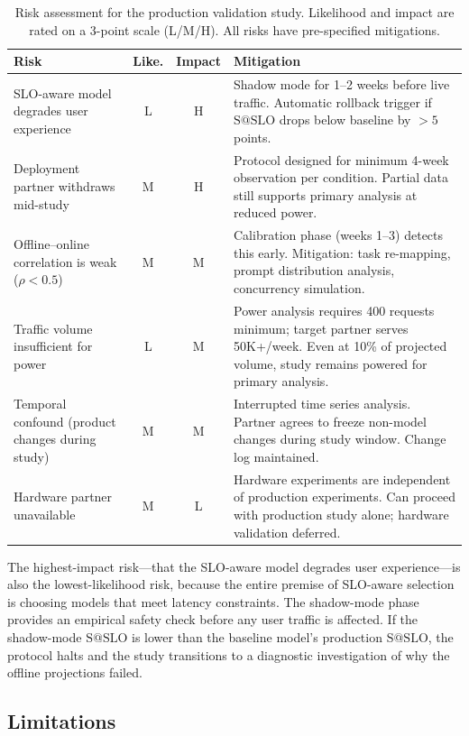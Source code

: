 \documentclass[11pt]{article}
\makeatletter
\newcommand{\sslo}{\ensuremath{\mathrm{S@SLO}}}
\makeatother
\begin{document}
\begin{table}[t]
\centering
\caption{Risk assessment for the production validation study. Likelihood and impact are rated on a 3-point scale (L/M/H). All risks have pre-specified mitigations.}
\label{tab:risks}
\small
\begin{tabular}{p{3.2cm} c c p{5.8cm}}
\toprule
\textbf{Risk} & \textbf{Like.} & \textbf{Impact} & \textbf{Mitigation} \\
\midrule
SLO-aware model degrades user experience & L & H & Shadow mode for 1--2 weeks before live traffic. Automatic rollback trigger if $\sslo{}$ drops below baseline by $>5$ points. \\[4pt]
Deployment partner withdraws mid-study & M & H & Protocol designed for minimum 4-week observation per condition. Partial data still supports primary analysis at reduced power. \\[4pt]
Offline--online correlation is weak ($\rho < 0.5$) & M & M & Calibration phase (weeks 1--3) detects this early. Mitigation: task re-mapping, prompt distribution analysis, concurrency simulation. \\[4pt]
Traffic volume insufficient for power & L & M & Power analysis requires 400 requests minimum; target partner serves 50K+/week. Even at 10\% of projected volume, study remains powered for primary analysis. \\[4pt]
Temporal confound (product changes during study) & M & M & Interrupted time series analysis. Partner agrees to freeze non-model changes during study window. Change log maintained. \\[4pt]
Hardware partner unavailable & M & L & Hardware experiments are independent of production experiments. Can proceed with production study alone; hardware validation deferred. \\
\bottomrule
\end{tabular}
\end{table}

The highest-impact risk---that the SLO-aware model degrades user experience---is also the lowest-likelihood risk, because the entire premise of SLO-aware selection is choosing models that meet latency constraints. The shadow-mode phase provides an empirical safety check before any user traffic is affected. If the shadow-mode $\sslo{}$ is lower than the baseline model's production $\sslo{}$, the protocol halts and the study transitions to a diagnostic investigation of why the offline projections failed.

\subsection{Limitations}
\end{document}
